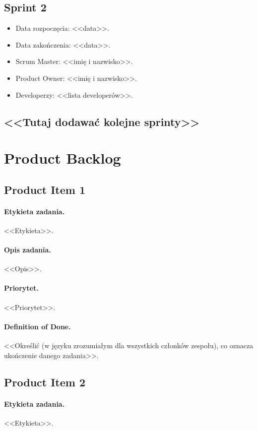 \documentclass[a4paper]{amsart}
\begin{document}
\subsection{Sprint 2}

\begin{itemize}
\item Data rozpoczęcia: <<data>>.
\item  Data zakończenia: <<data>>.
\item Scrum Master: <<imię i nazwisko>>.
\item Product Owner: <<imię i nazwisko>>.
\item Developerzy: <<lista developerów>>.
\end{itemize}

\subsection*{<<Tutaj dodawać kolejne sprinty>>}

\section{Product Backlog}

\subsection{Product Item 1}
\paragraph{Etykieta zadania.} <<Etykieta>>.
\paragraph{Opis zadania.} <<Opis>>.
\paragraph{Priorytet.} <<Priorytet>>.
\paragraph{Definition of Done.} <<Określić (w języku zrozumiałym dla wszystkich członków zespołu), co oznacza ukończenie danego zadania>>.

\subsection{Product Item 2}
\paragraph{Etykieta zadania.} <<Etykieta>>.
\end{document}
